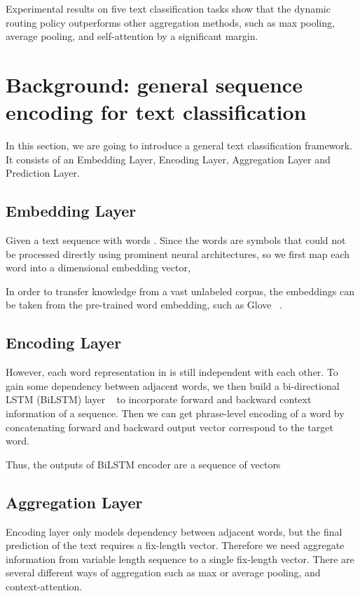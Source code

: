 \documentclass[11pt]{article}
\begin{document}
Experimental results on five text classification tasks show that the dynamic routing policy outperforms other aggregation methods, such as max pooling, average pooling, and self-attention by a significant margin.

\section{Background: general sequence encoding for text classification}



In this section, we are going to introduce a general text classification framework. It consists of an Embedding Layer, Encoding Layer, Aggregation Layer and Prediction Layer.

\subsection{Embedding Layer}
Given a text sequence with words . Since the words are symbols that could not be processed directly using prominent neural architectures, so we first map each word into a  dimensional embedding vector,


In order to transfer knowledge from a vast unlabeled corpus, the embeddings can be taken from the pre-trained word embedding, such as Glove ~\cite{pennington2014glove}.

\subsection{Encoding Layer}
However, each word representation in  is still independent with each other. To gain some dependency between adjacent words, we then build a bi-directional LSTM (BiLSTM) layer ~\cite{hochreiter1997long} to incorporate forward and backward context information of a sequence. Then we can get phrase-level encoding  of a word by concatenating forward  and backward output vector  correspond to the target word.



Thus, the outputs of BiLSTM encoder are a sequence of vectors


\subsection{Aggregation Layer}


Encoding layer only models dependency between adjacent words, but the final prediction of the text requires a fix-length vector. Therefore we need aggregate information from variable length sequence to a single fix-length vector. There are several different ways of aggregation such as max or average pooling, and context-attention.
\end{document}
